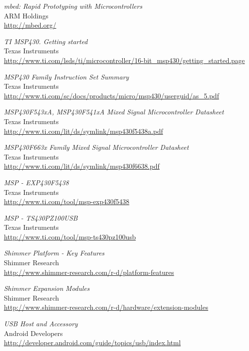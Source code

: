 \begin{thebibliography}{widest-label}
	\emph{mbed: Rapid Prototyping with Microcontrollers}\\
	ARM Holdings\\
	\url{http://mbed.org/}
	
	\emph{TI MSP430. Getting started}\\
	Texas Instruments\\
	\url{http://www.ti.com/lsds/ti/microcontroller/16-bit_msp430/getting_started.page}
	
	\emph{MSP430 Family Instruction Set Summary}\\
	Texas Instruments\\
	\url{http://www.ti.com/sc/docs/products/micro/msp430/userguid/as_5.pdf}
	
	\emph{MSP430F543xA, MSP430F541xA Mixed Signal Microcontroller Datasheet}\\
	Texas Instruments\\
	\url{http://www.ti.com/lit/ds/symlink/msp430f5438a.pdf}
	
	\emph{MSP430F663x Family Mixed Signal Microcontroller Datasheet}\\
	Texas Instruments\\
	\url{http://www.ti.com/lit/ds/symlink/msp430f6638.pdf}

	\emph{MSP - EXP430F5438}\\
	Texas Instruments\\
	\url{http://www.ti.com/tool/msp-exp430f5438}

	\emph{MSP - TS430PZ100USB}\\
	Texas Instruments\\
	\url{http://www.ti.com/tool/msp-ts430pz100usb}

	\emph{Shimmer Platform - Key Features}\\
	Shimmer Research\\
	\url{http://www.shimmer-research.com/r-d/platform-features}

	\emph{Shimmer Expansion Modules}\\
	Shimmer Research\\
	\url{http://www.shimmer-research.com/r-d/hardware/extension-modules}

	\emph{USB Host and Accessory}\\
	Android Developers\\
	\url{http://developer.android.com/guide/topics/usb/index.html}
	

\end{thebibliography}
